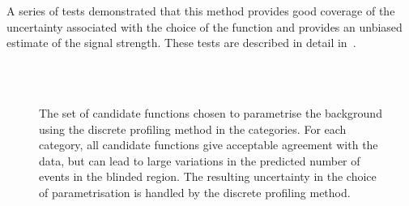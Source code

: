 A series of tests demonstrated that this method provides good coverage of the uncertainty associated with the choice of the function and provides an unbiased estimate of the signal strength. These tests are described in detail in~\cite{DiscreteProfiling}. 

\begin{figure}
 \begin{center}
 \\
 \\
 \caption{The set of candidate functions chosen to parametrise the background using the discrete profiling method in the \Untagged categories. For each category, all candidate functions give acceptable agreement with the data, but can lead to large variations in the predicted number of events in the blinded region. The resulting uncertainty in the choice of parametrisation is handled by the discrete profiling method.}
 \label{fig:model_bkg_multipdf}
 \end{center}
\end{figure}

